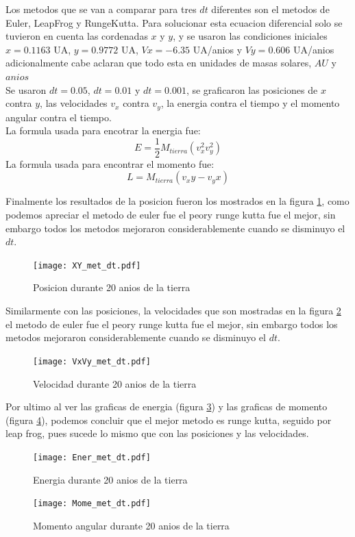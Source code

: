 \documentclass{article}
\begin{document}
Los metodos que se van a comparar para tres $dt$ diferentes son el metodos de Euler, LeapFrog y RungeKutta. Para solucionar esta ecuacion diferencial solo se tuvieron en cuenta las cordenadas $x$ y $y$, y se usaron las condiciones iniciales  $x = 0.1163$ UA, $y = 0.9772$ UA, $Vx = −6.35$ UA/anios y $Vy = 0.606$ UA/anios adicionalmente cabe aclaran que todo esta en unidades de masas solares, $AU$ y $anios$
\\
Se usaron $dt = 0.05$, $dt = 0.01$ y $dt = 0.001$, se graficaron las
posiciones de $x$ contra $y$, las velocidades $v_{x}$ contra $v_{y}$, la energia contra el tiempo y el momento angular contra el tiempo.
\\
La formula usada para encotrar la energia fue:
\begin{equation}
    E = \frac{1}{2} M_{tierra} (v_{x}^2 v_{y}^2)
\end{equation}
La formula usada para encontrar el momento fue:
\begin{equation}
    L = M_{tierra}(v_{x} y - v_{y} x)
\end{equation}

Finalmente los resultados de la posicion fueron los mostrados en la figura \ref{fig:mesh6}, como podemos apreciar el metodo de euler fue el peory runge kutta fue el mejor, sin embargo todos los metodos mejoraron considerablemente cuando se disminuyo el $dt$.

\begin{figure}
    \centering
    \texttt{[image: XY\_met\_dt.pdf]}
    \caption{Posicion durante 20 anios de la tierra}
    \label{fig:mesh6}
\end{figure}

Similarmente con las posiciones, la velocidades que son mostradas en la figura \ref{fig:mesh7} el metodo de euler fue el peory runge kutta fue el mejor, sin embargo todos los metodos mejoraron considerablemente cuando se disminuyo el $dt$.

\begin{figure}
    \centering
    \texttt{[image: VxVy\_met\_dt.pdf]}
    \caption{Velocidad durante 20 anios de la tierra}
    \label{fig:mesh7}
\end{figure}

Por ultimo al ver las graficas de energia (figura \ref{fig:mesh8}) y las graficas de momento (figura \ref{fig:mesh9}), podemos concluir que el mejor metodo es runge kutta, seguido por leap frog, pues sucede lo mismo que con las posiciones y las velocidades.

\begin{figure}
    \centering
    \texttt{[image: Ener\_met\_dt.pdf]}
    \caption{Energia durante 20 anios de la tierra}
    \label{fig:mesh8}
\end{figure}

\begin{figure}
    \centering
    \texttt{[image: Mome\_met\_dt.pdf]}
    \caption{Momento angular durante 20 anios de la tierra}
    \label{fig:mesh9}
\end{figure}
\end{document}
